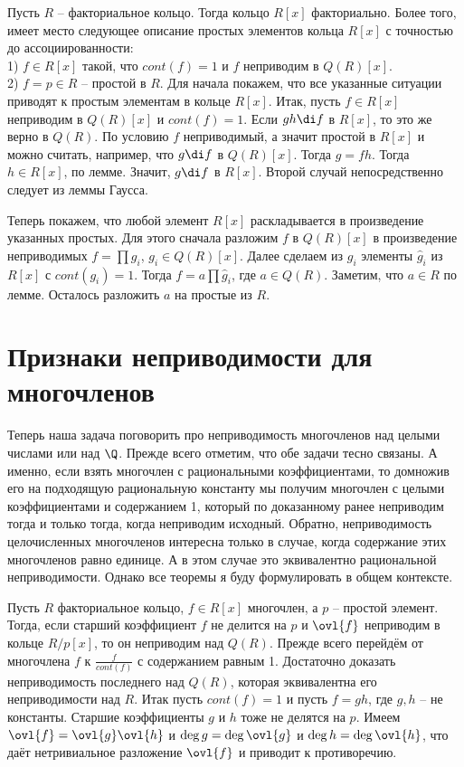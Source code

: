 \thrm Пусть $R$ -- факториальное кольцо. Тогда кольцо $R[x]$ факториально. Более того, имеет место следующее описание простых элементов кольца $R[x]$ с точностью до ассоциированности:\\
1) $f\in R[x]$ такой, что $cont(f)=1$ и $f$ неприводим в $Q(R)[x]$.\\
2) $f=p \in R$ -- простой в $R$.
\proof 
Для начала покажем, что все указанные ситуации приводят к простым элементам в кольце $R[x]$.
Итак, пусть $f \in R[x]$ неприводим в $Q(R)[x]$ и $cont(f)=1$. Если $gh\di f$ в $R[x]$, то это же верно в $Q(R)$. По условию $f$ неприводимый, а значит простой в $R[x]$ и можно считать, например, что $g\di f$ в $Q(R)[x]$. Тогда $g= fh$. Тогда $h\in R[x]$, по лемме. Значит, $g \di f$ в $R[x]$. Второй случай непосредственно следует из леммы Гаусса.


Теперь покажем, что любой элемент $R[x]$ раскладывается в произведение указанных простых. Для этого сначала разложим $f$ в $Q(R)[x]$ в произведение неприводимых $f=\prod g_i$, $g_i \in Q(R)[x]$. Далее сделаем из $g_i$ элементы $\hat{g}_i$ из $R[x]$ с $cont(g_i)=1$. Тогда $f=a\prod \hat{g}_i$, где $a\in Q(R)$. Заметим, что $a\in R$ по лемме. Осталось разложить $a$ на простые из $R$.
\endproof
\ethrm








\section{Признаки неприводимости для многочленов}

Теперь наша задача поговорить про неприводимость многочленов над целыми числами или над $\Q$. 
Прежде всего отметим, что обе задачи тесно связаны. А именно, если взять многочлен с рациональными коэффициентами, то домножив его на подходящую рациональную константу мы получим многочлен с целыми коэффициентами и содержанием 1, который по доказанному ранее неприводим тогда и только тогда, когда неприводим исходный. Обратно, неприводимость целочисленных многочленов интересна только в случае, когда содержание этих многочленов равно единице. А в этом случае это эквивалентно рациональной неприводимости. Однако все теоремы я буду формулировать в общем контексте.



 Пусть $R$ факториальное кольцо, $f \in  R[x]$ многочлен, а $p$ -- простой элемент. Тогда, если старший коэффициент $f$ не делится на $p$ и $\ovl{f}$ неприводим в кольце $R/p[x]$, то он неприводим над $Q(R)$. 
\proof Прежде всего перейдём от многочлена $f$ к $\frac{f}{cont(f)}$ с содержанием равным 1. Достаточно доказать неприводимость  последнего над $Q(R)$, которая эквивалентна его неприводимости над $R$. Итак пусть $cont(f)=1$ и пусть $f=gh$, где $g,h$ --  не константы. Старшие коэффициенты $g$ и $h$ тоже не делятся на $p$. Имеем $\ovl{f}= \ovl{g}\ovl{h}$ и $\deg g = \deg \ovl{g}$ и $\deg h = \deg \ovl{h}$, что даёт нетривиальное разложение $\ovl{f}$ и приводит к противоречию.
\endproof
\ethrm

